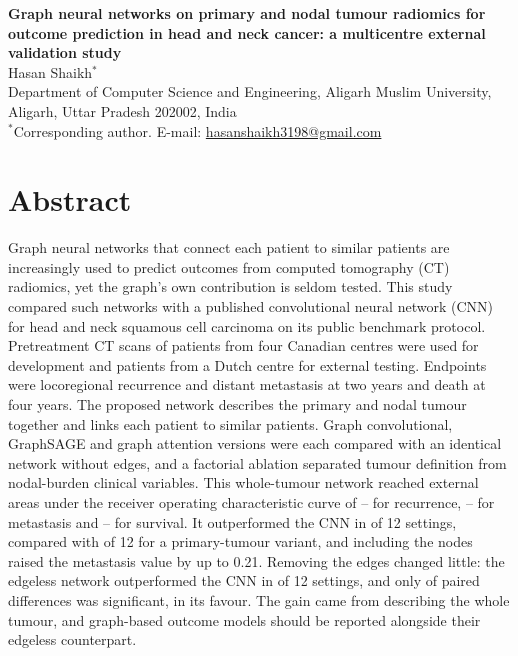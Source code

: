 \documentclass[11pt,a4paper]{article}
\begin{document}
\begin{center}
{\large\bfseries Graph neural networks on primary and nodal tumour radiomics for outcome prediction in head and neck cancer: a multicentre external validation study}\\[10pt]
{\normalsize Hasan Shaikh$^{*}$}\\[4pt]
{\small Department of Computer Science and Engineering, Aligarh Muslim University, Aligarh, Uttar Pradesh 202002, India}\\[6pt]
{\small $^{*}$Corresponding author. E-mail: \href{mailto:hasanshaikh3198@gmail.com}{hasanshaikh3198@gmail.com}}
\end{center}

\section*{Abstract}
Graph neural networks that connect each patient to similar patients are increasingly used to predict outcomes from computed tomography (CT) radiomics, yet the graph's own contribution is seldom tested. This study compared such networks with a published convolutional neural network (CNN) for head and neck squamous cell carcinoma on its public benchmark protocol. Pretreatment CT scans of \nPatCan{} patients from four Canadian centres were used for development and \nPatMAA{} patients from a Dutch centre for external testing. Endpoints were locoregional recurrence and distant metastasis at two years and death at four years. The proposed network describes the primary and nodal tumour together and links each patient to similar patients. Graph convolutional, GraphSAGE and graph attention versions were each compared with an identical network without edges, and a factorial ablation separated tumour definition from nodal-burden clinical variables. This whole-tumour network reached external areas under the receiver operating characteristic curve of \mainLRMin--\mainLRMax{} for recurrence, \mainDMMin--\mainDMMax{} for metastasis and \mainOSMin--\mainOSMax{} for survival. It outperformed the CNN in \winsGraph{} of 12 settings, compared with \winsPrimVol{} of 12 for a primary-tumour variant, and including the nodes raised the metastasis value by up to 0.21. Removing the edges changed little: the edgeless network outperformed the CNN in \winsMLP{} of 12 settings, and only \pairedNsig{} of \pairedN{} paired differences was significant, in its favour. The gain came from describing the whole tumour, and graph-based outcome models should be reported alongside their edgeless counterpart.
\end{document}
